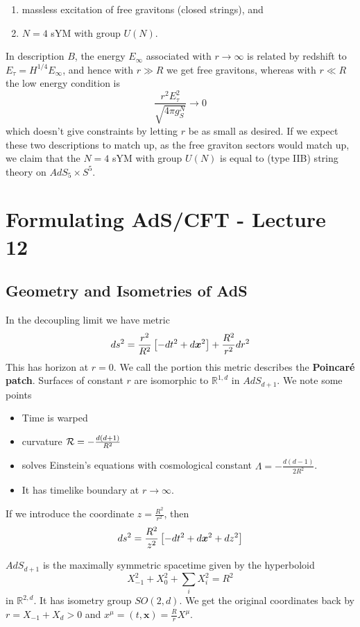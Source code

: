 \documentclass{article}
\begin{document}
\begin{enumerate}
	\item massless excitation of free gravitons (closed strings), and 
	\item $N=4$ sYM with group $U(N)$. 
\end{enumerate}
In description $B$, the energy $E_\infty$ associated with $r \to \infty$ is related by redshift to $E_\tau = H^{1/4} E_\infty$, and hence with $r \gg R$ we get free gravitons, whereas with $r \ll R$ the low energy condition is 
\[
\frac{r^2 E_\tau^2}{\sqrt{4 \pi g_S^N}} \to 0
\] 
which doesn't give constraints by letting $r$ be as small as desired. If we expect these two descriptions to match up, as the free graviton sectors would match up, we claim that the $N=4$ sYM with group $U(N)$ is equal to (type IIB) string theory on $AdS_5 \times S^5$. 

\section{Formulating AdS/CFT - Lecture 12}

\subsection{Geometry and Isometries of AdS}
In the decoupling limit we have metric 
\[
ds^2 = \frac{r^2}{R^2}\left[ -dt^2+ d\bm{x}^2 \right] + \frac{R^2}{r^{2}} dr^2
\]
This has horizon at $r=0$. We call the portion this metric describes the \textbf{Poincar\'e patch}. Surfaces of constant $r$ are isomorphic to $\mathbb{R}^{1,d}$ in $AdS_{d+1}$. We note some points
\begin{itemize}
	\item Time is warped
	\item curvature $\mathcal{R} = -\frac{d(d+1)}{R^2}$
	\item solves Einstein's equations with cosmological constant $\Lambda = - \frac{d(d-1)}{2R^2}$. 
	\item It has timelike boundary at $r \to \infty$. 
\end{itemize}
If we introduce the coordinate $z = \frac{R^2}{r^2}$, then 
\[
ds^2 = \frac{R^2}{z^2} \left[ -dt^2 + d\bm{x}^2 + dz^2 \right]
\]
\begin{definition}
	$AdS_{d+1}$ is the maximally symmetric spacetime given by the hyperboloid 
	\[
	X_{-1}^2 + X_0^2 + \sum_i X_i^2 = R^2
	\]
	in $\mathbb{R}^{2,d}$. It has isometry group $SO(2, d)$. We get the original coordinates back by $r=X_{-1}+X_d >0$ and $x^\mu = (t, \bm{x}) = \frac{R}{r}X^\mu$. 
\end{definition}
\end{document}
